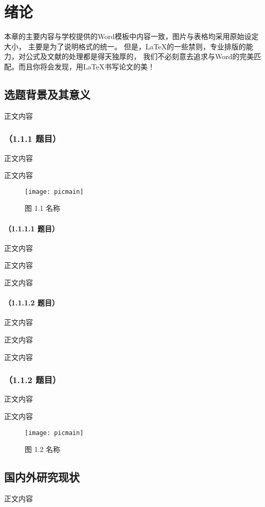 \chapter{绪论}

本章的主要内容与学校提供的Word模板中内容一致，图片与表格均采用原始设定大小，%
主要是为了说明格式的统一。%
但是，\LaTeX{}的一些禁则，专业排版的能力，对公式及文献的处理都是得天独厚的，%
我们不必刻意去追求与Word的完美匹配。而且你将会发现，用\LaTeX{}书写论文的美！ %

\section{选题背景及其意义}
正文内容

\subsection{（1.1.1 题目）}
正文内容

正文内容

\begin{figure}[htp]
\centering
\texttt{[image: picmain]}
\caption{图 1.1 名称}
\end{figure}

\subsubsection{（1.1.1.1 题目）}
正文内容

正文内容

正文内容

\subsubsection{（1.1.1.2 题目）}
正文内容

正文内容

正文内容

\subsection{（1.1.2 题目）}
正文内容

正文内容

\begin{figure}[htp]
\centering
\texttt{[image: picmain]}
\caption{图 1.2 名称}
\end{figure}

\section{国内外研究现状}
正文内容

